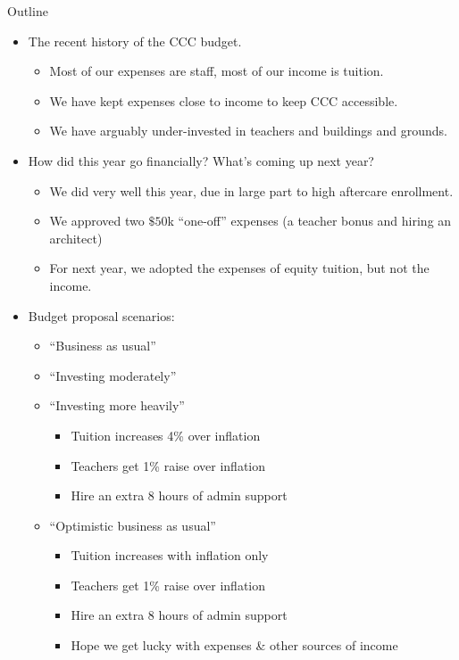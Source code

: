 \documentclass[8pt]{beamer}
\begin{document}
\begin{frame}{Outline}
%
\begin{itemize}
%
\item The recent history of the CCC budget.
\begin{itemize}
    \item Most of our expenses are staff, most of our income is tuition.
    \item We have kept expenses close to income to keep CCC accessible.
    \item We have arguably under-invested in teachers and buildings and grounds.
\end{itemize}
\pause
\item How did this year go financially?  What's coming up next year?
\begin{itemize}
    \item We did very well this year, due in large part to high aftercare enrollment.
    \item We approved two $\$50$k ``one-off'' expenses (a teacher bonus and hiring an architect)
    \item For next year, we adopted the expenses of equity tuition, but not the income.
\end{itemize}
\pause
\item Budget proposal scenarios:
\begin{itemize}
    \item ``Business as usual''
    \item ``Investing moderately''
    \item ``Investing more heavily''
        \begin{itemize}
        \item Tuition increases 4\% over inflation
        \item Teachers get 1\% raise over inflation
        \item Hire an extra 8 hours of admin support
        \end{itemize}
    \item ``Optimistic business as usual''
        \begin{itemize}
        \item Tuition increases with inflation only
        \item Teachers get 1\% raise over inflation
        \item Hire an extra 8 hours of admin support
        \item Hope we get lucky with expenses \& other sources of income
        \end{itemize}
%
\end{itemize}
\end{itemize}
%
\end{frame}
\end{document}
